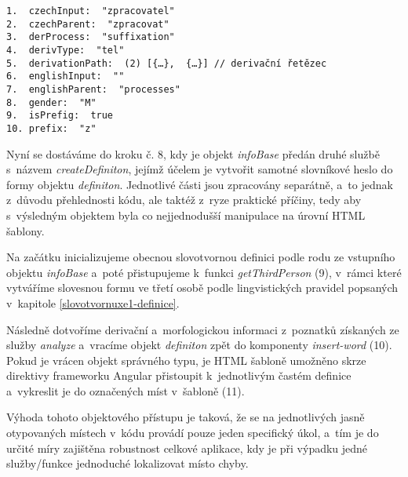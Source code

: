 \begin{verbatim}
1.  czechInput:  "zpracovatel"
2.  czechParent:  "zpracovat"
3.  derProcess:  "suffixation"
4.  derivType:  "tel"
5.  derivationPath:  (2) [{…},  {…}] // derivační řetězec
6.  englishInput:  ""
7.  englishParent:  "processes"
8.  gender:  "M"
9.  isPrefig:  true
10. prefix:  "z"
\end{verbatim}

Nyní se dostáváme do kroku č. 8, kdy je objekt \emph{infoBase} předán
druhé službě s~názvem \emph{createDefiniton}, jejímž účelem je vytvořit
samotné slovníkové heslo do formy objektu \emph{definiton}. Jednotlivé
části jsou zpracovány separátně, a~to jednak z~důvodu přehlednosti kódu,
ale taktéž z~ryze praktické příčiny, tedy aby s~výsledným objektem byla
co nejjednodušší manipulace na úrovní HTML šablony.

Na začátku inicializujeme obecnou slovotvornou definici podle rodu ze
vstupního objektu \emph{infoBase} a~poté přistupujeme k~funkci
\emph{getThirdPerson} (9), v~rámci které vytváříme slovesnou formu ve
třetí osobě podle lingvistických pravidel popsaných v~kapitole
\ref{slovotvornuxe1-definice}.

Následně dotvoříme derivační a~morfologickou informaci z~poznatků
získaných ze služby \emph{analyze} a~vracíme objekt \emph{definiton}
zpět do komponenty \emph{insert-word} (10). Pokud je vrácen objekt
správného typu, je HTML šabloně umožněno skrze direktivy frameworku
Angular přistoupit k~jednotlivým častém definice a~vykreslit je do
označených míst v~šabloně (11).

Výhoda tohoto objektového přístupu je taková, že se na jednotlivých
jasně otypovaných místech v~kódu provádí pouze jeden specifický úkol,
a~tím je do určité míry zajištěna robustnost celkové aplikace, kdy je při
výpadku jedné služby/funkce jednoduché lokalizovat místo chyby.
